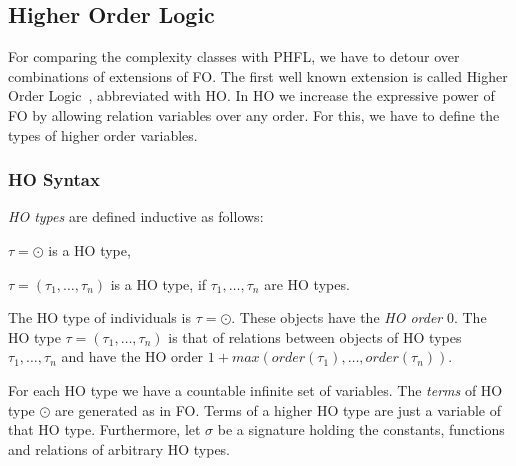 

\subsection{Higher Order Logic}\label{subsec:higherOrderLogic}

For comparing the complexity classes with PHFL, we have to detour over combinations of extensions of FO. The first well
known extension is called Higher Order Logic~\cite{vanBenthem2001higher}, abbreviated with HO. In HO we
increase the expressive power of FO by allowing relation variables over any order. For this, we have to define the
types of higher order variables.

\subsubsection{HO Syntax}

\begin{definition}
    \emph{HO types} are defined inductive as follows:
    \begin{compactitem}
        \item $\tau = \odot$ is a HO type,
        \item $\tau = (\tau_1, \dots, \tau_n)$ is a HO type, if $\tau_1, \dots, \tau_n$ are
        HO types.
    \end{compactitem}
\end{definition}

The HO type of individuals is $\tau = \odot$. These objects have the \textit{HO order} $0$. The HO type $\tau = (\tau_1,
\dots, \tau_n)$ is that of relations between objects of HO types $\tau_1, \dots, \tau_n$ and have the HO order $1 + max
(order(\tau_1), \dots, order(\tau_n))$.

For each HO type we have a countable infinite set of variables. The \textit{terms} of HO type $\odot$ are
generated as in FO. Terms of a higher HO type are just a variable of that HO type. Furthermore, let $\sigma$ be
a signature holding the constants, functions and relations of arbitrary HO types.

